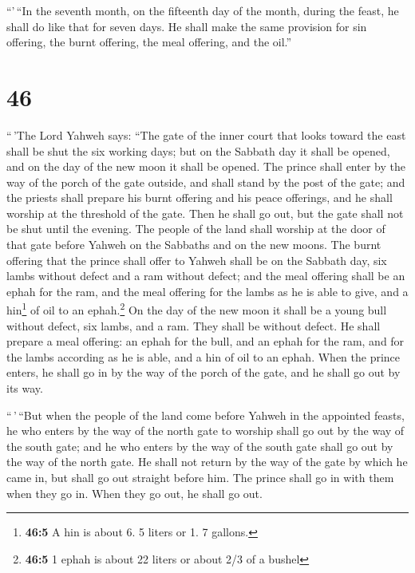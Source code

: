  ``'\,``In the seventh month, on the fifteenth day of the
month, during the feast, he shall do like that for seven days. He shall
make the same provision for sin offering, the burnt offering, the meal
offering, and the oil.''

\hypertarget{section-44}{%
\section{46}\label{section-44}}

 ``\,'The Lord Yahweh says: ``The gate of the inner court
that looks toward the east shall be shut the six working days; but on
the Sabbath day it shall be opened, and on the day of the new moon it
shall be opened.  The prince shall enter by the way of the
porch of the gate outside, and shall stand by the post of the gate; and
the priests shall prepare his burnt offering and his peace offerings,
and he shall worship at the threshold of the gate. Then he shall go out,
but the gate shall not be shut until the evening.  The
people of the land shall worship at the door of that gate before Yahweh
on the Sabbaths and on the new moons.  The burnt offering
that the prince shall offer to Yahweh shall be on the Sabbath day, six
lambs without defect and a ram without defect;  and the
meal offering shall be an ephah for the ram, and the meal offering for
the lambs as he is able to give, and a hin\footnote{\textbf{46:5} A hin
  is about 6. 5 liters or 1. 7 gallons.} of oil to an ephah.\footnote{\textbf{46:5}
  1 ephah is about 22 liters or about 2/3 of a bushel}  On
the day of the new moon it shall be a young bull without defect, six
lambs, and a ram. They shall be without defect.  He shall
prepare a meal offering: an ephah for the bull, and an ephah for the
ram, and for the lambs according as he is able, and a hin of oil to an
ephah.  When the prince enters, he shall go in by the way
of the porch of the gate, and he shall go out by its way.

 ``\,'\,``But when the people of the land come before
Yahweh in the appointed feasts, he who enters by the way of the north
gate to worship shall go out by the way of the south gate; and he who
enters by the way of the south gate shall go out by the way of the north
gate. He shall not return by the way of the gate by which he came in,
but shall go out straight before him.  The prince shall
go in with them when they go in. When they go out, he shall go out.

